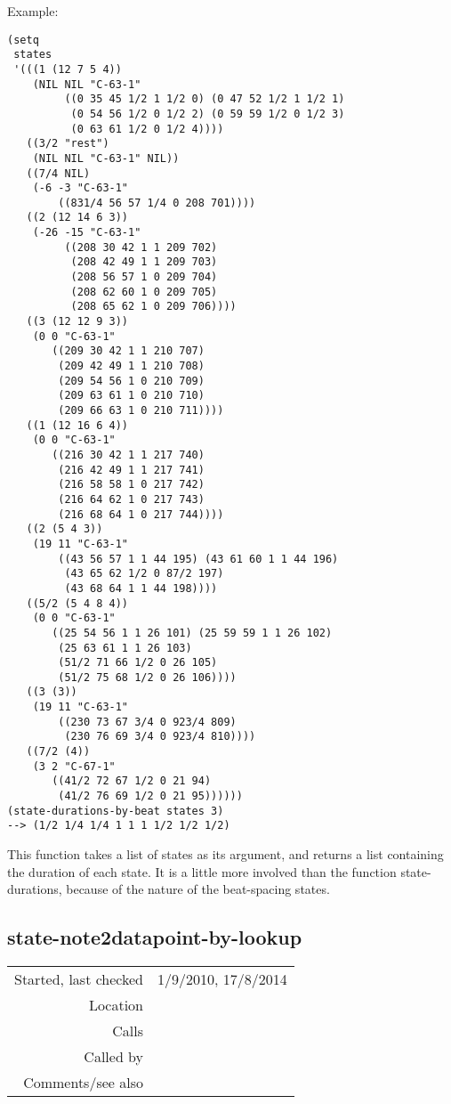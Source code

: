 \vspace{0.5cm}
\noindent Example:
\begin{verbatim}
(setq
 states
 '(((1 (12 7 5 4))
    (NIL NIL "C-63-1"
         ((0 35 45 1/2 1 1/2 0) (0 47 52 1/2 1 1/2 1)
          (0 54 56 1/2 0 1/2 2) (0 59 59 1/2 0 1/2 3)
          (0 63 61 1/2 0 1/2 4))))
   ((3/2 "rest")
    (NIL NIL "C-63-1" NIL))
   ((7/4 NIL)
    (-6 -3 "C-63-1"
        ((831/4 56 57 1/4 0 208 701))))
   ((2 (12 14 6 3))
    (-26 -15 "C-63-1"
         ((208 30 42 1 1 209 702)
          (208 42 49 1 1 209 703)
          (208 56 57 1 0 209 704)
          (208 62 60 1 0 209 705)
          (208 65 62 1 0 209 706))))
   ((3 (12 12 9 3))
    (0 0 "C-63-1"
       ((209 30 42 1 1 210 707)
        (209 42 49 1 1 210 708)
        (209 54 56 1 0 210 709)
        (209 63 61 1 0 210 710)
        (209 66 63 1 0 210 711))))
   ((1 (12 16 6 4))
    (0 0 "C-63-1"
       ((216 30 42 1 1 217 740)
        (216 42 49 1 1 217 741)
        (216 58 58 1 0 217 742)
        (216 64 62 1 0 217 743)
        (216 68 64 1 0 217 744))))
   ((2 (5 4 3))
    (19 11 "C-63-1"
        ((43 56 57 1 1 44 195) (43 61 60 1 1 44 196)
         (43 65 62 1/2 0 87/2 197)
         (43 68 64 1 1 44 198))))
   ((5/2 (5 4 8 4))
    (0 0 "C-63-1"
       ((25 54 56 1 1 26 101) (25 59 59 1 1 26 102)
        (25 63 61 1 1 26 103)
        (51/2 71 66 1/2 0 26 105)
        (51/2 75 68 1/2 0 26 106))))
   ((3 (3))
    (19 11 "C-63-1"
        ((230 73 67 3/4 0 923/4 809)
         (230 76 69 3/4 0 923/4 810))))
   ((7/2 (4))
    (3 2 "C-67-1"
       ((41/2 72 67 1/2 0 21 94)
        (41/2 76 69 1/2 0 21 95))))))
(state-durations-by-beat states 3)
--> (1/2 1/4 1/4 1 1 1 1/2 1/2 1/2)
\end{verbatim}

\noindent This function takes a list of states as its
argument, and returns a list containing the duration
of each state. It is a little more involved than the
function state-durations, because of the nature of
the beat-spacing states.


\subsection*{state-note2datapoint-by-lookup}\label{fun:state-note2datapoint-by-lookup}

\vspace{0.3cm}
\begin{tabular}{r|p{8cm}}
Started, last checked & 1/9/2010, 17/8/2014 \\
Location & \nameref{sec:realising-states} \\
Calls & \nameref{fun:index-of-offtime-by-lookup} \\
Called by & \nameref{fun:half-state2datapoints-by-lookup} \\
Comments/see also & \nameref{fun:state-note2datapoint}
\end{tabular}

